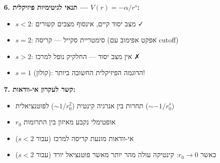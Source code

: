 \begin{summarybox}{}
\textbf{6. תנאי לגיטימיות פיזיקלית — $V(r) = -\alpha/r^s$:}
\begin{itemize}
    \item $s < 2$: מצב יסוד קיים, אינסוף מצבים קשורים ✓
    \item $s = 2$: סימטריית סקייל — קריסה (אפקט אפימוב עם cutoff)
    \item $s > 2$: אין מצב יסוד — החלקיק נופל למרכז ✗
    \item $s = 1$ (קולון): הדוגמה הפיזיקלית החשובה ביותר!
\end{itemize}

\textbf{7. קשר לעקרון אי-וודאות:}
\begin{itemize}
    \item תחרות בין אנרגיה קינטית ($\sim 1/r_0^2$) לפוטנציאלית ($\sim -1/r_0^s$)
    \item $r_0$ אופטימלי נקבע מאיזון בין התרומות
    \item אי-וודאות מונעת קריסה למרכז (עבור $s < 2$)
    \item כאשר $r_0 \to 0$: קינטיקה עולה מהר יותר מאשר פוטנציאל יורד (עבור $s < 2$)
\end{itemize}
\end{summarybox}
\newpage
